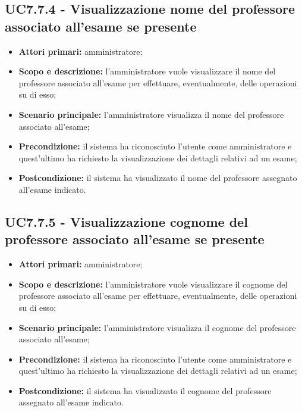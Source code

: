 \documentclass[AnalisiDeiRequisiti.tex]{subfiles}
\begin{document}
\subsection{UC7.7.4 - Visualizzazione nome del professore associato all'esame se presente}
\begin{itemize}
	\item \textbf{Attori primari:} amministratore;
	\item \textbf{Scopo e descrizione:} l'amministratore vuole visualizzare il nome del professore associato all'esame per effettuare, eventualmente, delle operazioni su di esso;
	\item \textbf{Scenario principale:} l'amministratore visualizza il nome del professore associato all'esame;
	\item \textbf{Precondizione:} il sistema ha riconosciuto l'utente come amministratore e quest'ultimo ha richiesto la visualizzazione dei dettagli relativi ad un esame; 
	\item \textbf{Postcondizione:} il sistema ha visualizzato il nome del professore assegnato all'esame indicato.
\end{itemize}
\subsection{UC7.7.5 - Visualizzazione cognome del professore associato all'esame se presente}
\begin{itemize}
	\item \textbf{Attori primari:} amministratore;
	\item \textbf{Scopo e descrizione:} l'amministratore vuole visualizzare il cognome del professore associato all'esame per effettuare, eventualmente, delle operazioni su di esso;
	\item \textbf{Scenario principale:} l'amministratore visualizza il cognome del professore associato all'esame;
	\item \textbf{Precondizione:} il sistema ha riconosciuto l'utente come amministratore e quest'ultimo ha richiesto la visualizzazione dei dettagli relativi ad un esame; 
	\item \textbf{Postcondizione:} il sistema ha visualizzato il cognome del professore assegnato all'esame indicato.
\end{itemize}
\end{document}
